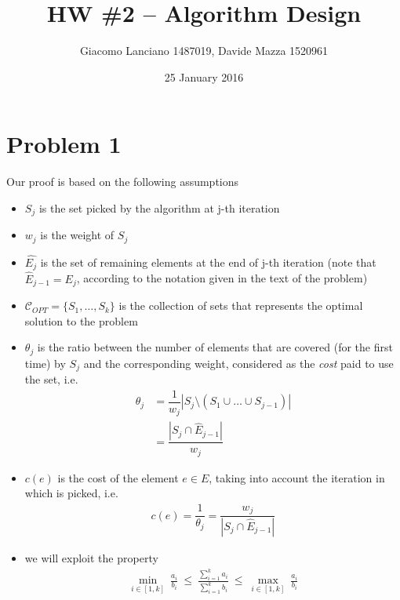 \documentclass[a4paper,11pt]{article}
\begin{document}
	
	\title{HW \#2 – Algorithm Design}
	\author{Giacomo Lanciano 1487019, Davide Mazza 1520961}
	\date{25 January 2016}
	\maketitle

\section{Problem 1}
Our proof is based on the following assumptions

\begin{itemize}
	\item $S_{j}$ is the set picked by the algorithm at j-th iteration
	
	\item $w_j$ is the weight of $S_{j}$
	
	\item $\hat{E_{j}}$ is the set of remaining elements at the end of j-th iteration (note that $\hat{E}_{j-1} = E_j$, according to the notation given in the text of the problem)
	
	\item $\mathcal{C}_{OPT} = \{ S_{1},\ldots, S_{k}\} $ is the collection of sets that represents the optimal solution to the problem
	
	\item $\theta_{j}$ is the ratio between the number of elements that are covered (for the first time) by $S_{j}$ and the corresponding weight, considered as the \textit{cost} paid to use the set, i.e.
	\begin{align*} 
	\theta_{j} &= \dfrac{1}{w_{j}} \left| S_{j} \setminus (S_{1} \cup \ldots \cup S_{j-1}) \right| \\
	&= \dfrac{\left| S_{j} \cap \hat{E}_{j-1} \right| }{w_{j}}
	\end{align*}
	
	\item $c(e)$ is the cost of the element $e \in E$, taking into account the iteration in which is picked, i.e.
	\begin{align*}
	c(e) = \dfrac{1}{\theta_{j}}= \dfrac{w_{j}}{\left| S_{j} \cap \hat{E}_{j-1} \right| }	
	\end{align*}
	
	\item we will exploit the property
	\begin{align}
	\min_{i \in [1,k]} \ \frac{a_{i}}{b_{i}} \ \le \ \frac{\sum\limits_{i=1}^{k}{a_{i}}}{\sum\limits_{i=1}^{k}{b_{i}}} \ \le \ \max_{i \in [1,k]} \ \frac{a_{i}}{b_{i}} \label{1.4}
	\end{align}
\end{itemize}
\end{document}
